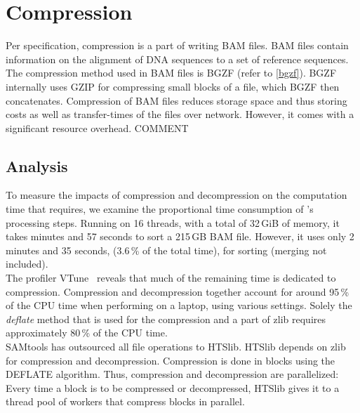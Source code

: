 \section{Compression} 
Per specification, compression is a part of writing BAM files. BAM files contain information on the alignment of DNA sequences to a set of reference sequences. The compression method used in BAM files is BGZF (refer to \ref{bgzf}). BGZF internally uses GZIP for compressing small blocks of a file, which BGZF then concatenates. Compression of BAM files reduces storage space and thus storing costs as well as transfer-times of the files over network. However, it comes with a significant resource overhead. 
COMMENT

\subsection{Analysis}
To measure the impacts of compression and decompression on the computation time that \sort requires, we examine the proportional time consumption of \sort's processing steps. 
Running on 16 threads, with a total of 32\,GiB of memory, it takes  minutes and 57 seconds to sort a 215\,GB BAM file. However, it uses only 2 minutes and 35 seconds, (3.6\,\% of the total time), for sorting (merging not included). \\

The profiler VTune~\cite{noauthor_fix_nodate} reveals that much of the remaining time is dedicated to compression.  
Compression and decompression together account for around 95\,\% of the CPU time when performing \sort on a laptop, using various settings. Solely the \textit{deflate} method that is used for the compression and a part of zlib requires approximately 80\,\% of the CPU time. \\
SAMtools has outsourced all file operations to HTSlib. HTSlib depends on zlib for compression and decompression. Compression is done in blocks using the DEFLATE algorithm. Thus, compression and decompression are parallelized: Every time a block is to be compressed or decompressed, HTSlib gives it to a thread pool of workers that compress blocks in parallel.



